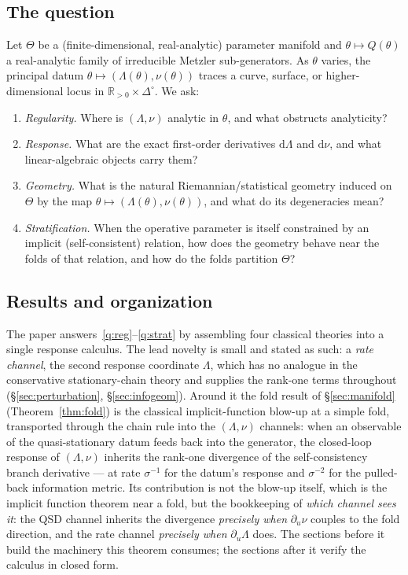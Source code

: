 \documentclass[11pt,reqno]{amsart}
\theoremstyle{plain}
\theoremstyle{definition}
\theoremstyle{remark}
\newcommand{\R}{\mathbb{R}}
\newcommand{\Simp}{\Delta^{\!\circ}}
\newcommand{\dd}{\mathrm{d}}
\begin{document}
\subsection{The question}
Let $\Theta$ be a (finite-dimensional, real-analytic) parameter manifold and
$\theta\mapsto Q(\theta)$ a real-analytic family of irreducible Metzler
sub-generators. As $\theta$ varies, the principal datum
$\theta\mapsto(\Lambda(\theta),\nu(\theta))$ traces a curve, surface, or
higher-dimensional locus in $\R_{>0}\times\Simp$. We ask:

\begin{enumerate}[label=\textup{(Q\arabic*)},leftmargin=3.2em]
\item\label{q:reg} \emph{Regularity.} Where is $(\Lambda,\nu)$ analytic in
$\theta$, and what obstructs analyticity?
\item\label{q:resp} \emph{Response.} What are the exact first-order derivatives
$\dd\Lambda$ and $\dd\nu$, and what linear-algebraic objects carry them?
\item\label{q:geom} \emph{Geometry.} What is the natural Riemannian/statistical
geometry induced on $\Theta$ by the map $\theta\mapsto(\Lambda(\theta),\nu(\theta))$,
and what do its degeneracies mean?
\item\label{q:strat} \emph{Stratification.} When the operative parameter is itself
constrained by an implicit (self-consistent) relation, how does the geometry
behave near the folds of that relation, and how do the folds partition $\Theta$?
\end{enumerate}

\subsection{Results and organization}
The paper answers~\ref{q:reg}--\ref{q:strat} by assembling four classical
theories into a single response calculus. The lead novelty is small and stated as
such: a \emph{rate channel}, the second response coordinate $\Lambda$, which has no
analogue in the conservative stationary-chain theory and supplies the rank-one
terms throughout (\S\ref{sec:perturbation}, \S\ref{sec:infogeom}). Around it the
fold result of \S\ref{sec:manifold} (Theorem~\ref{thm:fold}) is the classical
implicit-function blow-up at a simple fold, transported through the chain rule into
the $(\Lambda,\nu)$ channels: when an observable of the quasi-stationary datum
feeds back into the generator, the closed-loop response of $(\Lambda,\nu)$ inherits
the rank-one divergence of the self-consistency branch derivative --- at rate
$\sigma^{-1}$ for the datum's response and $\sigma^{-2}$ for the pulled-back information
metric. Its contribution is not the blow-up itself, which is the implicit function
theorem near a fold, but the bookkeeping of \emph{which channel sees it}: the QSD
channel inherits the divergence \emph{precisely when} $\partial_u\nu$ couples to the
fold direction, and the rate channel \emph{precisely when} $\partial_u\Lambda$ does.
The sections before it build the machinery this theorem consumes; the sections
after it verify the calculus in closed form.
\end{document}
